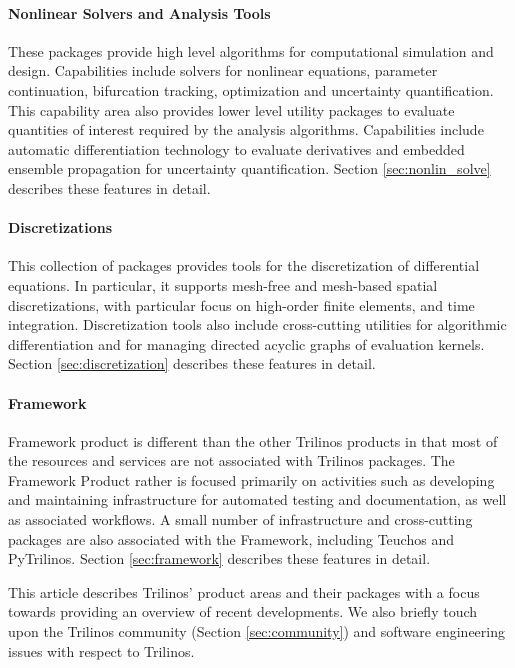 \paragraph{Nonlinear Solvers and Analysis Tools} These packages provide high level algorithms for computational simulation and design. Capabilities include solvers for nonlinear equations, parameter continuation, bifurcation tracking, optimization and uncertainty quantification. This capability area also provides lower level utility packages to evaluate quantities of interest required by the analysis algorithms. Capabilities include automatic differentiation technology to evaluate derivatives and embedded ensemble propagation for uncertainty quantification. Section \ref{sec:nonlin_solve} describes these features in detail.

\paragraph{Discretizations} This collection of packages provides tools for the discretization of differential equations. In particular, it supports mesh-free and mesh-based spatial discretizations, with particular focus on high-order finite elements, and time integration. Discretization tools also include cross-cutting utilities for algorithmic differentiation and for managing directed acyclic graphs of evaluation kernels. Section \ref{sec:discretization} describes these features in detail.

\paragraph{Framework} Framework product is different than the other Trilinos products in that most of the resources and services are not associated with Trilinos packages. The Framework Product rather is focused primarily on activities such as developing and maintaining infrastructure for automated testing and documentation, as well as associated workflows. A small number of infrastructure and cross-cutting packages are also associated with the Framework, including Teuchos and PyTrilinos. Section \ref{sec:framework} describes these features in detail.

This article describes Trilinos' product areas and their packages with a focus towards providing an overview of recent developments. We also briefly touch upon the Trilinos community (Section \ref{sec:community}) and software engineering issues with respect to Trilinos.

